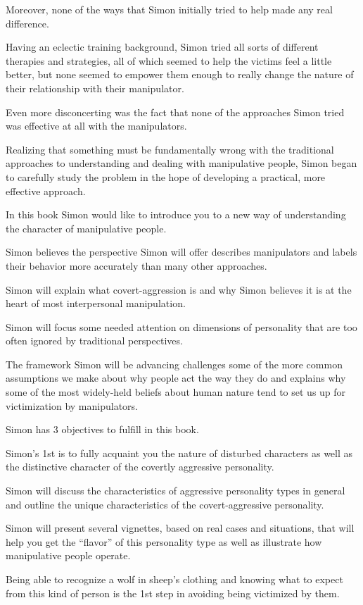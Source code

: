 \documentclass[oneside]{book}
\numberwithin{equation}{section}
\begin{document}
Moreover, none of the ways that Simon initially tried to help made any real difference.

Having an eclectic training background, Simon tried all sorts of different therapies and strategies, all of which seemed to help the victims feel a little better, but none seemed to empower them enough to really change the nature of their relationship with their manipulator.

Even more disconcerting was the fact that none of the approaches Simon tried was effective at all with the manipulators.

Realizing that something must be fundamentally wrong with the traditional approaches to understanding and dealing with manipulative people, Simon began to carefully study the problem in the hope of developing a practical, more effective approach.

%
In this book Simon would like to introduce you to a new way of understanding the character of manipulative people.

Simon believes the perspective Simon will offer describes manipulators and labels their behavior more accurately than many other approaches.

Simon will explain what covert-aggression is and why Simon believes it is at the heart of most interpersonal manipulation.

Simon will focus some needed attention on dimensions of personality that are too often ignored by traditional perspectives.

The framework Simon will be advancing challenges some of the more common assumptions we make about why people act the way they do and explains why some of the most widely-held beliefs about human nature tend to set us up for victimization by manipulators.

%
Simon has 3 objectives to fulfill in this book.

Simon's 1st is to fully acquaint you the nature of disturbed characters as well as the distinctive character of the covertly aggressive personality.

Simon will discuss the characteristics of aggressive personality types in general and outline the unique characteristics of the covert-aggressive personality.

Simon will present several vignettes, based on real cases and situations, that will help you get the ``flavor'' of this personality type as well as illustrate how manipulative people operate.

Being able to recognize a wolf in sheep's clothing and knowing what to expect from this kind of person is the 1st step in avoiding being victimized by them.
\end{document}
